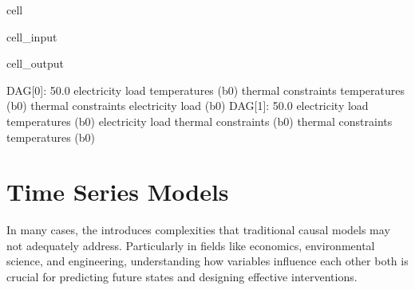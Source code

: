 \documentclass[letterpaper,10pt,english]{jupyterBook}
\begin{document}
\begin{sphinxuseclass}{cell}\begin{sphinxVerbatimInput}

\begin{sphinxuseclass}{cell_input}
\begin{sphinxVerbatim}[commandchars=\\\{\}]
    
  
\end{sphinxVerbatim}

\end{sphinxuseclass}\end{sphinxVerbatimInput}
\begin{sphinxVerbatimOutput}

\begin{sphinxuseclass}{cell_output}
\begin{sphinxVerbatim}[commandchars=\\\{\}]
DAG[0]: 50.0\PYGZpc{}
	electricity load \PYGZlt{}\PYGZhy{}\PYGZhy{}\PYGZhy{} temperatures (b\PYGZgt{}0)
	thermal constraints \PYGZlt{}\PYGZhy{}\PYGZhy{}\PYGZhy{} temperatures (b\PYGZgt{}0)
	thermal constraints \PYGZlt{}\PYGZhy{}\PYGZhy{}\PYGZhy{} electricity load (b\PYGZgt{}0)
DAG[1]: 50.0\PYGZpc{}
	electricity load \PYGZlt{}\PYGZhy{}\PYGZhy{}\PYGZhy{} temperatures (b\PYGZgt{}0)
	electricity load \PYGZlt{}\PYGZhy{}\PYGZhy{}\PYGZhy{} thermal constraints (b\PYGZgt{}0)
	thermal constraints \PYGZlt{}\PYGZhy{}\PYGZhy{}\PYGZhy{} temperatures (b\PYGZgt{}0)
\end{sphinxVerbatim}

\end{sphinxuseclass}\end{sphinxVerbatimOutput}

\end{sphinxuseclass}
\sphinxstepscope


\chapter{Time Series Models}
\label{\detokenize{notebooks/semiparametric_varlingam:time-series-models}}\label{\detokenize{notebooks/semiparametric_varlingam::doc}}
\sphinxAtStartPar
In many cases, the  introduces complexities that traditional causal models may not adequately address. Particularly in fields like economics, environmental science, and engineering, understanding how variables influence each other both  is crucial for predicting future states and designing effective interventions.
\end{document}
